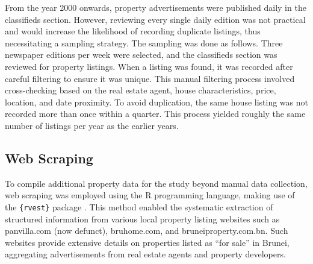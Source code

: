 \documentclass[
  number]{elsarticle}
\begin{document}
From the year 2000 onwards, property advertisements were published daily
in the classifieds section. However, reviewing every single daily
edition was not practical and would increase the likelihood of recording
duplicate listings, thus necessitating a sampling strategy. The sampling
was done as follows. Three newspaper editions per week were selected,
and the classifieds section was reviewed for property listings. When a
listing was found, it was recorded after careful filtering to ensure it
was unique. This manual filtering process involved cross-checking based
on the real estate agent, house characteristics, price, location, and
date proximity. To avoid duplication, the same house listing was not
recorded more than once within a quarter. This process yielded roughly
the same number of listings per year as the earlier years.

\subsection{Web Scraping}\label{web-scraping}

To compile additional property data for the study beyond manual data
collection, web scraping was employed using the R programming language,
making use of the \texttt{\{rvest\}} package \citep{wickham2024rvest}.
This method enabled the systematic extraction of structured information
from various local property listing websites such as panvilla.com (now
defunct), bruhome.com, and bruneiproperty.com.bn. Such websites provide
extensive details on properties listed as ``for sale'' in Brunei,
aggregating advertisements from real estate agents and property
developers.
\end{document}
